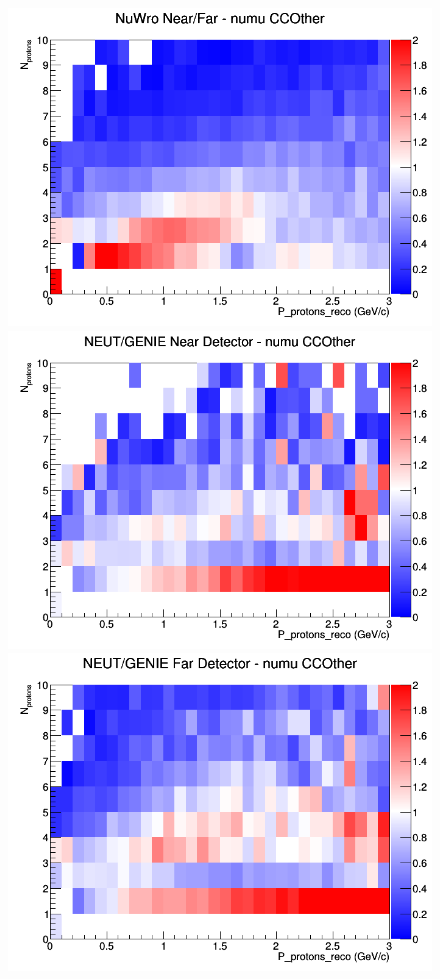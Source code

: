 \begin{figure}[h]
\endminipage
{}
\includegraphics[width=\linewidth]{eff_N_P/FGT/protons/ratios/CCOther_NuWro_numu_NF_N_P.png}
\endminipage
\newline
{}
\includegraphics[width=\linewidth]{eff_N_P/FGT/protons/ratios/CCOther_NEUT_GENIE_numu_near_N_P.png}
\endminipage
{}
\includegraphics[width=\linewidth]{eff_N_P/FGT/protons/ratios/CCOther_NEUT_GENIE_numu_far_N_P.png}

\end{figure}
